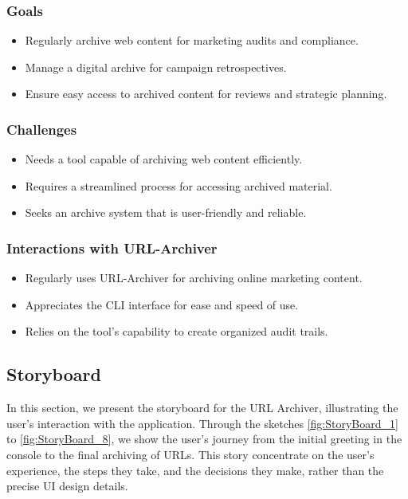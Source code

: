 \subsubsection{Goals}
\begin{itemize}
    \item Regularly archive web content for marketing audits and compliance.
    \item Manage a digital archive for campaign retrospectives.
    \item Ensure easy access to archived content for reviews and strategic planning.
\end{itemize}

\subsubsection{Challenges}
\begin{itemize}
    \item Needs a tool capable of archiving web content efficiently.
    \item Requires a streamlined process for accessing archived material.
    \item Seeks an archive system that is user-friendly and reliable.
\end{itemize}

\subsubsection{Interactions with URL-Archiver}
\begin{itemize}
    \item Regularly uses URL-Archiver for archiving online marketing content.
    \item Appreciates the CLI interface for ease and speed of use.
    \item Relies on the tool's capability to create organized audit trails.
\end{itemize}


\subsection{Storyboard}
In this section, we present the storyboard for the URL Archiver, illustrating the user's interaction with the application.
Through the sketches \ref{fig:StoryBoard_1} to \ref{fig:StoryBoard_8}, we show the user's journey from the initial greeting in the console to the final archiving of URLs.
This story concentrate on the user's experience, the steps they take, and the decisions they make, rather than the precise UI design details.

